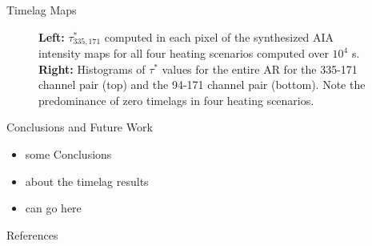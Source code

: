 \documentclass[final]{beamer}
\begin{document}
\begin{frame}
\begin{columns}[T]
\begin{column}{0.49\linewidth}
\begin{block}{Timelag Maps}
\begin{figure}
{            \label{fig:timelag_maps}}
            \caption{\textbf{Left:} $\tau^*_{335,171}$ computed in each pixel of the synthesized AIA intensity maps for all four heating scenarios computed over $10^4$ s. \textbf{Right:} Histograms of $\tau^*$ values for the entire AR for the 335-171 channel pair (top) and the 94-171 channel pair (bottom). Note the predominance of zero timelags in four heating scenarios.}
            \label{fig:timelags}
        \end{figure}
    \end{block}
    \begin{block}{Conclusions and Future Work}
      \begin{itemize}
        \item some Conclusions
        \item about the timelag results
        \item can go here
      \end{itemize}
    \end{block}
    \begin{block}{References}
      \scriptsize
      \begin{multicols}{2}
        
        
      \end{multicols}
    \end{block}
  \end{column}
  \end{columns}
\end{frame}
\end{document}
